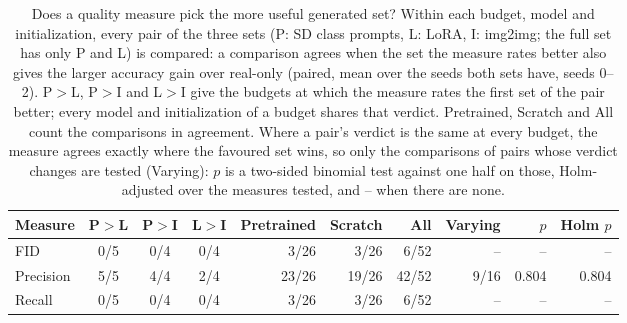 \begin{table}[H]
\centering
\small
\setlength{\tabcolsep}{4pt}
\caption{Does a quality measure pick the more useful generated set? Within each budget, model and initialization, every pair of the three sets (P: SD class prompts, L: LoRA, I: img2img; the full set has only P and L) is compared: a comparison agrees when the set the measure rates better also gives the larger accuracy gain over real-only (paired, mean over the seeds both sets have, seeds 0--2). P$>$L, P$>$I and L$>$I give the budgets at which the measure rates the first set of the pair better; every model and initialization of a budget shares that verdict. Pretrained, Scratch and All count the comparisons in agreement. Where a pair's verdict is the same at every budget, the measure agrees exactly where the favoured set wins, so only the comparisons of pairs whose verdict changes are tested (Varying): $p$ is a two-sided binomial test against one half on those, Holm-adjusted over the measures tested, and -- when there are none.}
\label{tab:pool-utility}
\begin{tabular}{lcccrrrrrr}
\toprule
Measure & P$>$L & P$>$I & L$>$I & Pretrained & Scratch & All & Varying & $p$ & Holm $p$ \\
\midrule
FID & 0/5 & 0/4 & 0/4 & 3/26 & 3/26 & 6/52 & -- & -- & -- \\
Precision & 5/5 & 4/4 & 2/4 & 23/26 & 19/26 & 42/52 & 9/16 & 0.804 & 0.804 \\
Recall & 0/5 & 0/4 & 0/4 & 3/26 & 3/26 & 6/52 & -- & -- & -- \\
\bottomrule
\end{tabular}
\end{table}
